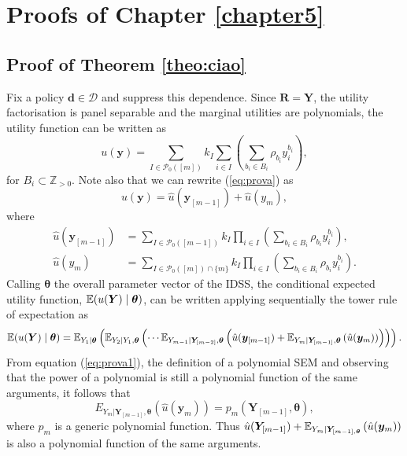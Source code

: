 \section{Proofs of Chapter \ref{chapter5}}
\subsection{Proof of Theorem \ref{theo:ciao}}
\label{proof:theociao}
Fix a policy $\bm{d}\in\bm{\mathcal{D}}$ and suppress this dependence. Since $\bm{R}=\bm{Y}$, the utility factorisation is panel separable and the marginal utilities are polynomials, the utility function can be written as
\begin{equation}
u(\bm{y})=\sum_{I\in\mathcal{P}_0([m])}k_I\sum_{i\in I}\left(\sum_{b_i\in B_i}\rho_{b_i}y_i^{b_i}\right),
\label{eq:prova}
\end{equation}
for $B_i\subset \mathbb{Z}_{>0}$. Note also that we can rewrite (\ref{eq:prova}) as
\begin{equation*}
u(\bm{y})=\hat{u}(\bm{y}_{[m-1]})+\hat{u}(y_{m}),
\end{equation*}
where 
\begin{align}
\hat{u}(\bm{y}_{[m-1]})&=\sum_{I\in\mathcal{P}_0([m-1])}k_I\prod_{i\in I}\left(\sum_{b_i\in B_i}\rho_{b_i}y_i^{b_i}\right),\nonumber\\
\hat{u}(y_{m})&=\sum_{I\in\mathcal{P}_0([m])\cap\{m\}}k_I\prod_{i\in I}\left(\sum_{b_i\in B_i}\rho_{b_i}y_i^{b_i}\right).\label{eq:prova1}
\end{align}
Calling $\bm{\theta}$ the overall parameter vector of the IDSS, the conditional expected utility function, $\mathbb{E}(u(\bm{Y})\;|\;\bm{\theta})$, can be written applying sequentially the tower rule of expectation as
\begin{equation}
\E(u(\bm{Y})\;|\;\bm{\theta})=\E_{Y_1|\bm{\theta}}\left(\E_{Y_2|Y_1,\bm{\theta}}\left(\cdots \E_{Y_{m-1}|\bm{Y}_{[m-2]},\bm{\theta}}\left(\hat{u}(\bm{y}_{[m-1]})+\E_{Y_m|\bm{Y}_{[m-1]},\bm{\theta}}\left(\hat{u}(\bm{y}_{m})\right)\right)\right)\right).
\label{eq:prova3}
\end{equation}
From equation (\ref{eq:prova1}), the definition of a polynomial SEM and observing that the power of a polynomial is still a polynomial function of the same arguments, it follows that 
\begin{equation}
E_{Y_m|\bm{Y}_{[m-1]},\bm{\theta}}\left(\hat{u}(\bm{y}_{m})\right)=p_m(\bm{Y}_{[m-1]},\bm{\theta}), \label{eq:prova2}
\end{equation}
where $p_m$ is a generic polynomial function. Thus $\hat{u}(\bm{Y}_{[m-1]})+\mathbb{E}_{Y_m|\bm{Y}_{[m-1],\bm{\theta}}}\left(\hat{u}(\bm{y}_{m})\right)$ is also a polynomial function of the same arguments. 

